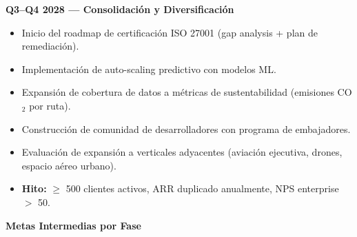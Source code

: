 ﻿\documentclass[11pt, letterpaper]{article}
\begin{document}
\textbf{Q3--Q4 2028 --- Consolidación y Diversificación}

\begin{itemize}[leftmargin=1.5cm, label=\textbullet, itemsep=2pt, topsep=4pt]

    \item Inicio del roadmap de certificación ISO 27001 (gap analysis + plan de remediación).

    \item Implementación de auto-scaling predictivo con modelos ML.

    \item Expansión de cobertura de datos a métricas de sustentabilidad (emisiones CO$_2$ por ruta).

    \item Construcción de comunidad de desarrolladores con programa de embajadores.

    \item Evaluación de expansión a verticales adyacentes (aviación ejecutiva, drones, espacio aéreo urbano).

    \item \textbf{Hito:} $\ge$ 500 clientes activos, ARR duplicado anualmente, NPS enterprise $>$ 50.

\end{itemize}



\medskip

\textbf{Metas Intermedias por Fase}
\end{document}
